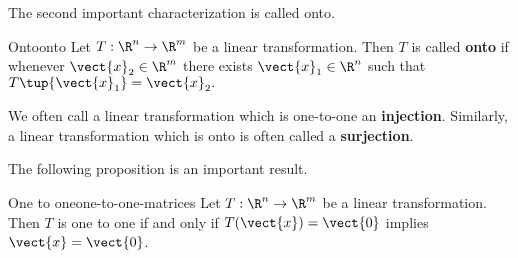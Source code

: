 The second important characterization is called onto.

\begin{definition}{Onto}{onto}
Let $T: \R^n \to \R^m$ be a linear transformation. Then $T$ is called \textbf{onto} if whenever $\vect{x}_2 \in \R^{m}$ there exists 
$\vect{x}_1 \in \R^{n}$ such that $T\tup{\vect{x}_1} = \vect{x}_2. $
\end{definition}

We often call a linear transformation which is one-to-one an \textbf{injection}. Similarly, a linear transformation which is onto is often called a \textbf{surjection}.

The following proposition is an important result. 

\begin{proposition}{One to one}{one-to-one-matrices}
Let $T:\R^n \to \R^m$ be a linear transformation. Then $T$ is one to one if
and only if $T(\vect{x}) = \vect{0}$ implies $\vect{x}=\vect{0}$.
\end{proposition}

